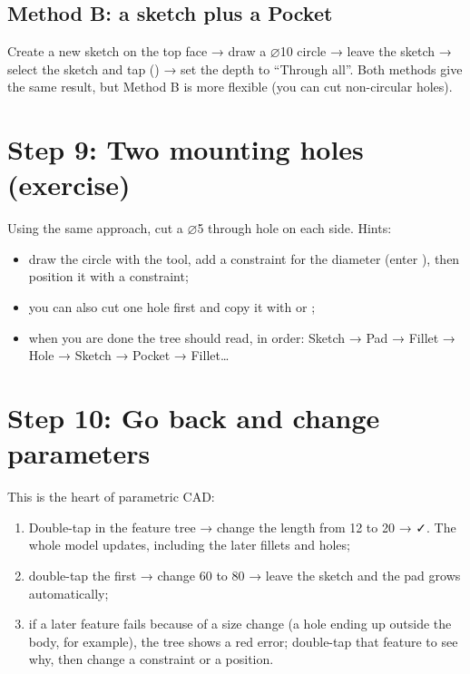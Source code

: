 \subsection{Method B: a sketch plus a Pocket}

Create a new sketch on the top face → draw a ⌀10 circle → leave the sketch → select the sketch and tap
 () → set the depth to “Through all”. Both methods give the same result, but
Method B is more flexible (you can cut non-circular holes).

\section{Step 9: Two mounting holes (exercise)}

Using the same approach, cut a ⌀5 through hole on each side. Hints:
\begin{itemize}
  \item draw the circle with the  tool, add a  constraint for the diameter (enter
        ), then position it with a  constraint;
  \item you can also cut one hole first and copy it with  or ;
  \item when you are done the tree should read, in order: Sketch → Pad → Fillet → Hole → Sketch → Pocket →
        Fillet…
\end{itemize}

\section{Step 10: Go back and change parameters}

This is the heart of parametric CAD:

\begin{enumerate}
  \item Double-tap  in the feature tree → change the length from 12 to 20 → ✓. The whole model updates,
        including the later fillets and holes;
  \item double-tap the first  → change 60 to 80 → leave the sketch and the pad grows automatically;
  \item if a later feature fails because of a size change (a hole ending up outside the body, for example),
        the tree shows a red error; double-tap that feature to see why, then change a constraint or a position.
\end{enumerate}

